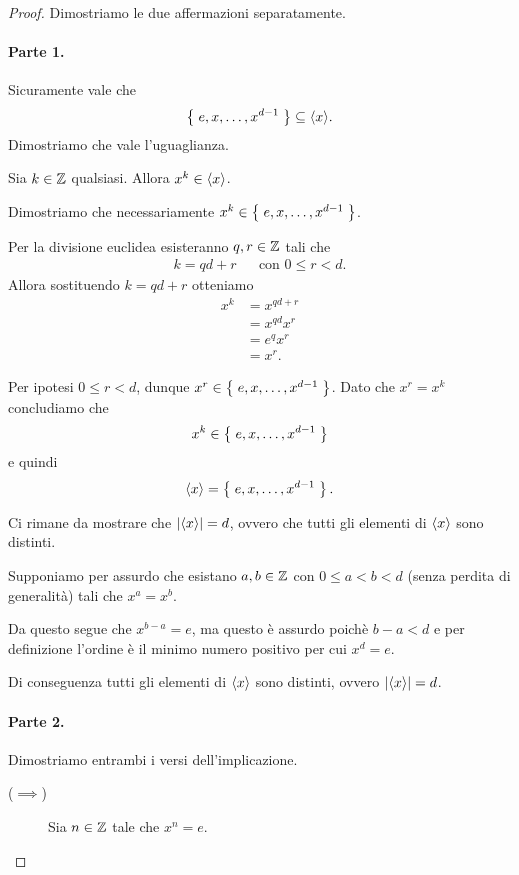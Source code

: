\begin{proof}
    Dimostriamo le due affermazioni separatamente. 
    
    \paragraph{Parte 1.} Sicuramente vale che \[
        \set{e, x, \dots, x^{d-1}} \subseteq \gen{x}.    
    \] Dimostriamo che vale l'uguaglianza.

    Sia $k \in \Z$ qualsiasi. Allora $x^k \in \gen x$. 
    
    Dimostriamo che necessariamente $x^k \in \set{e, x, \dots, x^{d-1}}$.

    Per la divisione euclidea esisteranno $q, r \in \Z$ tali che \begin{align*}
        k = qd + r &&\text{con } 0 \leq r < d.
    \end{align*} Allora sostituendo $k = qd+r$ otteniamo \begin{align*}
        x^k &= x^{qd + r}\\
        &= x^{qd}x^r\\
        &= e^qx^r\\
        &= x^r.
    \end{align*}
    
    Per ipotesi $0 \leq r < d$, dunque $x^r \in \set{e, x, \dots, x^{d-1}}$. Dato che $x^r = x^k$ concludiamo che \[
        x^k \in \set{e, x, \dots, x^{d-1}}    
    \] e quindi \[
        \gen x = \set{e, x, \dots, x^{d-1}}.    
    \]

    Ci rimane da mostrare che $\abs*{\gen* x} = d$, ovvero che tutti gli elementi di $\gen x$ sono distinti. 

    Supponiamo per assurdo che esistano $a, b \in \Z$ con $0 \leq a < b < d$ (senza perdita di generalità) tali che $x^a = x^b$.

    Da questo segue che $x^{b-a} = e$, ma questo è assurdo poichè $b-a < d$ e per definizione l'ordine è il minimo numero positivo per cui $x^d = e$.

    Di conseguenza tutti gli elementi di $\gen x$ sono distinti, ovvero $\abs*{\gen* x} = d$.

    \paragraph{Parte 2.} Dimostriamo entrambi i versi dell'implicazione.
    \begin{description}
        \item[($\implies$)] Sia $n \in \Z$ tale che $x^n = e$.
        

\end{description}
\end{proof}
